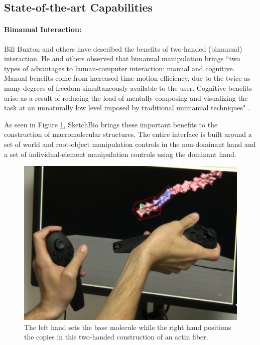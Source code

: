 \documentclass[twocolumn]{bmcart}%
\begin{document}
\subsection*{State-of-the-art Capabilities}

\paragraph*{Bimanual Interaction:}
Bill Buxton and others have described the benefits of two-handed (bimanual) interaction.  He and others observed that bimanual manipulation brings ``two types of advantages to human-computer interaction: manual and cognitive. Manual benefits come from increased time-motion efficiency, due to the twice as many degrees of freedom simultaneously available to the user. Cognitive benefits arise as a result of reducing the load of mentally composing and visualizing the task at an unnaturally low level imposed by traditional unimanual techniques" \cite{Leganchuk1998manual}.

As seen in Figure \ref{fig:two_hands}, SketchBio brings these important benefits to the construction of macromolecular structures.  The entire interface is built around a set of world and root-object manipulation controls in the non-dominant hand and a set of individual-element manipulation controls using the dominant hand.

\begin{figure}[ht]
\centering
\includegraphics[width=0.9\columnwidth]{two_hands.png}
\caption{The left hand sets the base molecule while the right hand positions the copies in this two-handed construction of an actin fiber.}
\label{fig:two_hands}
\end{figure}
\end{document}
